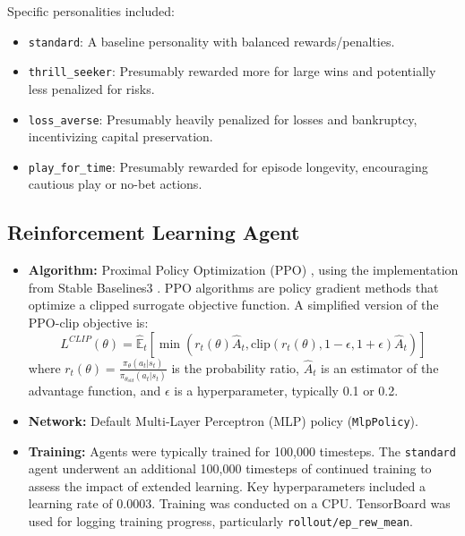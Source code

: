 \documentclass{article}
\begin{document}
Specific personalities included:
\begin{itemize}
    \item \texttt{standard}: A baseline personality with balanced rewards/penalties.
    \item \texttt{thrill\_seeker}: Presumably rewarded more for large wins and potentially less penalized for risks.
    \item \texttt{loss\_averse}: Presumably heavily penalized for losses and bankruptcy, incentivizing capital preservation.
    \item \texttt{play\_for\_time}: Presumably rewarded for episode longevity, encouraging cautious play or no-bet actions.
\end{itemize}

\subsection{Reinforcement Learning Agent}
\begin{itemize}
    \item \textbf{Algorithm:} Proximal Policy Optimization (PPO) \cite{Schulman2017}, using the implementation from Stable Baselines3 \cite{Raffin2021}. PPO algorithms are policy gradient methods that optimize a clipped surrogate objective function. A simplified version of the PPO-clip objective is:
    \[ L^{CLIP}(\theta) = \hat{\mathbb{E}}_t [ \min(r_t(\theta)\hat{A}_t, \text{clip}(r_t(\theta), 1-\epsilon, 1+\epsilon)\hat{A}_t) ] \]
    where \(r_t(\theta) = \frac{\pi_\theta(a_t|s_t)}{\pi_{\theta_{old}}(a_t|s_t)}\) is the probability ratio, \(\hat{A}_t\) is an estimator of the advantage function, and \(\epsilon\) is a hyperparameter, typically 0.1 or 0.2.
    \item \textbf{Network:} Default Multi-Layer Perceptron (MLP) policy (\texttt{MlpPolicy}).
    \item \textbf{Training:} Agents were typically trained for 100,000 timesteps. The \texttt{standard} agent underwent an additional 100,000 timesteps of continued training to assess the impact of extended learning. Key hyperparameters included a learning rate of 0.0003. Training was conducted on a CPU. TensorBoard was used for logging training progress, particularly \texttt{rollout/ep\_rew\_mean}.
\end{itemize}
\end{document}

